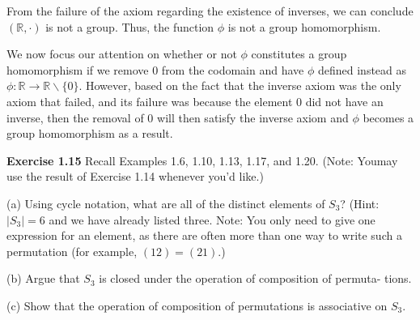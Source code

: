 \documentclass[12pt, a4paper]{article}
\begin{document}
\begin{flushleft}
From the failure of the axiom regarding the existence of inverses, we can conclude $(\mathbb{R}, \cdot)$ is not a group. Thus, the function $\phi$ is not a group homomorphism.\linebreak
\par
We now focus our attention on whether or not $\phi$ constitutes a group homomorphism if we remove $0$ from the codomain and have $\phi$ defined instead as $\phi: \mathbb{R} \rightarrow \mathbb{R} \backslash \{ 0\}$. However, based on the fact that the inverse axiom was the only axiom that failed, and its failure was because the element $0$ did not have an inverse, then the removal of $0$ will then satisfy the inverse axiom and $\phi$ becomes a group homomorphism as a result.\linebreak
\par

\begin{flushleft}
\hspace*{8mm} \textbf{Exercise 1.15} Recall Examples 1.6, 1.10, 1.13, 1.17, and 1.20.  (Note: You\linebreak may use the result of Exercise 1.14 whenever you'd like.)\linebreak
\end{flushleft}

\begin{flushleft}

\hspace*{10mm}(a) Using cycle notation, what are all of the distinct elements of $S_3$?\linebreak
\hspace*{16.7mm}(Hint: $|S_3|=6$ and we have already listed three. Note: You only need to\linebreak
\hspace*{16.7mm}give one expression for an element, as there are often more than one way\linebreak
\hspace*{16.7mm}to write such a permutation (for example, $(12)=(21)$.)\linebreak

\hspace*{10mm}(b) Argue that $S_3$ is closed under the operation of composition of permuta-\linebreak
\hspace*{16.7mm}tions.\linebreak

\hspace*{10mm}(c) Show that the operation of composition of permutations is associative on\linebreak
\hspace*{16.7mm}$S_3$.\linebreak


\end{flushleft}
\end{flushleft}
\end{document}
